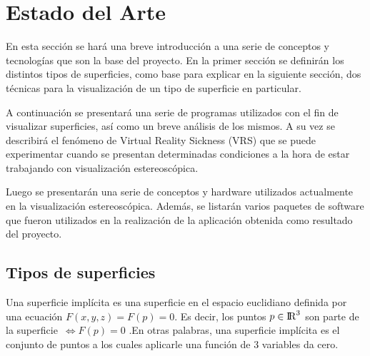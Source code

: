 \documentclass[12pt]{article}
\begin{document}
\section{Estado del Arte}
\noindent En esta sección se hará una breve introducción a una serie de conceptos y tecnologías que son la base del proyecto. En la primer sección se definirán los distintos tipos de superficies, como base para explicar en la siguiente sección, dos técnicas para la visualización de un tipo de superficie en particular. 

A continuación se presentará una serie de programas utilizados con el fin de visualizar superficies, así como un breve análisis de los mismos. A su vez se describirá el fenómeno de Virtual Reality Sickness (VRS) que se puede experimentar cuando se presentan determinadas condiciones a la hora de estar trabajando con visualización estereoscópica.

Luego se presentarán una serie de conceptos y hardware utilizados actualmente en la visualización estereoscópica. Además, se listarán varios paquetes de software que fueron utilizados en la realización de la aplicación obtenida como resultado del proyecto.
\subsection{Tipos de superficies}
Una superficie implícita es una superficie en el espacio euclidiano definida por una ecuación $F (x, y, z) =  F(p) = 0$.  Es decir, los  puntos $ p \in {\rm I\!R} ^3$ son parte de la superficie~$ \iff F(p) = 0$ \cite{realtimerendering}.En otras palabras, una superficie implícita es el conjunto de puntos a los cuales aplicarle una función de 3 variables da cero. 
\end{document}
